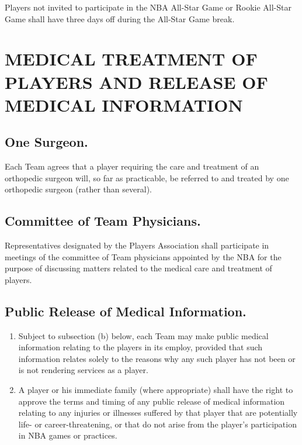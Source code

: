\documentclass[
]{book}
\providecommand{\tightlist}{%
  \setlength{\itemsep}{0pt}\setlength{\parskip}{0pt}}
\begin{document}
Players not invited to participate in the NBA All-Star Game or Rookie All-Star Game shall have three days off during the All-Star Game break.

\hypertarget{medical-treatment-of-players-and-release-of-medical-information}{%
\chapter{MEDICAL TREATMENT OF PLAYERS AND RELEASE OF MEDICAL INFORMATION}\label{medical-treatment-of-players-and-release-of-medical-information}}


\hypertarget{one-surgeon.}{%
\section{One Surgeon.}\label{one-surgeon.}}

Each Team agrees that a player requiring the care and treatment of an orthopedic surgeon will, so far as practicable, be referred to and treated by one orthopedic surgeon (rather than several).

\hypertarget{committee-of-team-physicians.}{%
\section{Committee of Team Physicians.}\label{committee-of-team-physicians.}}

Representatives designated by the Players Association shall participate in meetings of the committee of Team physicians appointed by the NBA for the purpose of discussing matters related to the medical care and treatment of players.

\hypertarget{public-release-of-medical-information.}{%
\section{Public Release of Medical Information.}\label{public-release-of-medical-information.}}

\begin{enumerate}
\def\labelenumi{(\alph{enumi})}
\tightlist
\item
  Subject to subsection (b) below, each Team may make public medical information relating to the players in its employ, provided that such information relates solely to the reasons why any such player has not been or is not rendering services as a player.
\item
  A player or his immediate family (where appropriate) shall have the right to approve the terms and timing of any public release of medical information relating to any injuries or illnesses suffered by that player that are potentially life- or career-threatening, or that do not arise from the player's participation in NBA games or practices.
\end{enumerate}
\end{document}
